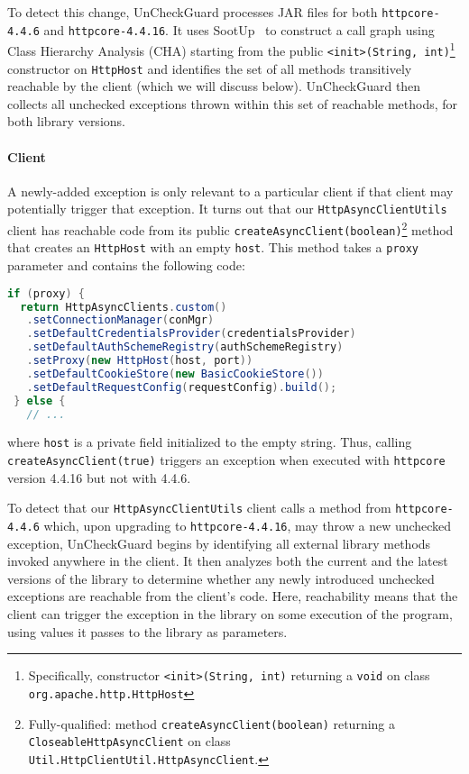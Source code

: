 To detect this change, UnCheckGuard processes JAR files for both \texttt{httpcore-4.4.6} and \texttt{httpcore-4.4.16}. It uses SootUp~\cite{Karakaya24:_sootup} to construct a call graph using Class Hierarchy Analysis (CHA) starting from the public \texttt{<init>(String, int)}\footnote{Specifically, constructor \texttt{<init>(String, int)} returning a \texttt{void} on class \texttt{org.apache.http.HttpHost}} constructor on \texttt{HttpHost} and identifies the set of all methods transitively reachable by the client (which we will discuss below). UnCheckGuard then collects all unchecked exceptions thrown within this set of reachable methods, for both library versions.

\paragraph{Client} 
A newly-added exception is only relevant to a particular client if that client may
potentially trigger that exception.  It turns out that
our \texttt{HttpAsyncClientUtils} client has reachable code from its public \texttt{createAsyncClient(boolean)}\footnote{Fully-qualified: method \texttt{createAsyncClient(boolean)} returning a \texttt{CloseableHttpAsyncClient} on class \texttt{Util.HttpClientUtil.HttpAsyncClient}.} method
that creates an \texttt{HttpHost} with an empty \texttt{host}. This
method takes a \texttt{proxy}
parameter and contains the following code:
\begin{lstlisting}[language=Java,basicstyle=\scriptsize\ttfamily]
 if (proxy) {
  return HttpAsyncClients.custom()
   .setConnectionManager(conMgr)
   .setDefaultCredentialsProvider(credentialsProvider)
   .setDefaultAuthSchemeRegistry(authSchemeRegistry)
   .setProxy(new HttpHost(host, port))
   .setDefaultCookieStore(new BasicCookieStore())
   .setDefaultRequestConfig(requestConfig).build();
 } else {
   // ...
\end{lstlisting}
where \texttt{host} is a private field initialized to the empty string.
Thus, calling \texttt{createAsyncClient(true)} triggers an exception when executed with
\texttt{httpcore} version 4.4.16 but not with 4.4.6.

To detect that our \texttt{HttpAsyncClientUtils} client calls a method from \texttt{httpcore-4.4.6} which, upon upgrading to \texttt{httpcore-4.4.16}, may throw a new unchecked exception, UnCheckGuard begins by identifying all external library methods invoked anywhere in the client. It then analyzes both the current and the latest versions of the library to determine whether any newly introduced unchecked exceptions are reachable from the client's code. Here, reachability means that the client can trigger the exception in the library on some execution of the program, using values it passes to the library as parameters.

